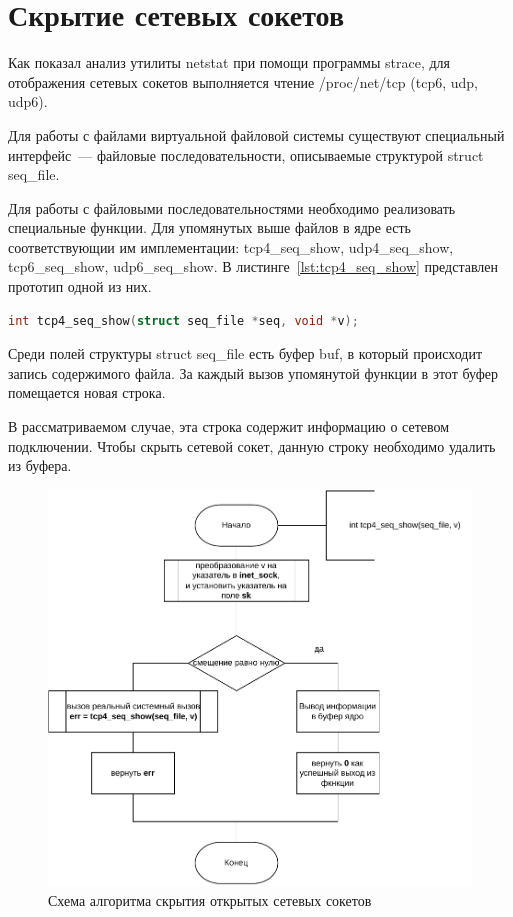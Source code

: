 \section{Скрытие сетевых сокетов}%
\label{sec:skrytie_setevykh_soketov}

Как показал анализ утилиты netstat при помощи программы strace, для отображения сетевых сокетов выполняется чтение /proc/net/tcp (tcp6, udp, udp6).

Для работы с файлами виртуальной файловой системы существуют специальный интерфейс~--- файловые последовательности, описываемые структурой struct seq\_file.

Для работы с файловыми последовательностями необходимо реализовать специальные функции. Для упомянутых выше файлов в ядре есть соответствующии им имплементации: tcp4\_seq\_show, udp4\_seq\_show, tcp6\_seq\_show, udp6\_seq\_show. В листинге~\ref{lst:tcp4_seq_show} представлен прототип одной из них.
\begin{lstlisting}[language=c,caption={Прототип tcp4\_seq\_show},label=lst:tcp4_seq_show]
int tcp4_seq_show(struct seq_file *seq, void *v);
\end{lstlisting}

Среди полей структуры struct seq\_file есть буфер buf, в который происходит запись содержимого файла. За каждый вызов упомянутой функции в этот буфер помещается новая строка.

В рассматриваемом случае, эта строка содержит информацию о сетевом подключении. Чтобы скрыть сетевой сокет, данную строку необходимо удалить из буфера.

\begin{figure}[H]
    \centering
    \includegraphics[scale=0.65]{pdf/os_net.pdf}
    \caption{Схема алгоритма скрытия открытых сетевых сокетов}\label{img:net_hide_scheme}
\end{figure}


